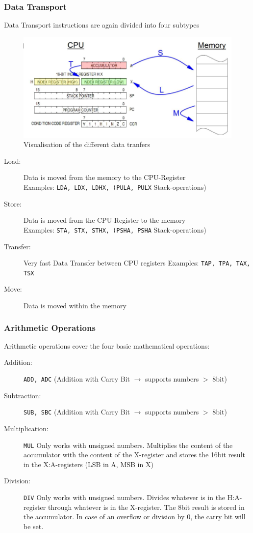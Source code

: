 \documentclass[a4paper, 11pt, nofootinbib]{book}
\newcommand{\code}[1]{\texttt{#1}}
\begin{document}
\subsubsection{Data Transport}
Data Transport instructions are again divided into four subtypes

\begin{figure}[htb!]
	\centering
	\includegraphics[keepaspectratio=true,height=15\baselineskip]{assOperations.PNG}
	\caption{Visualisation of the different data tranfers}
	\label{label}
\end{figure}

\begin{description}
	\item[Load: ] Data is moved from the memory to the CPU-Register \\
		Examples: \code{LDA, LDX, LDHX, (PULA, PULX} Stack-operations)
	\item[Store: ] Data is moved from the CPU-Register to the memory \\
		Examples: \code{STA, STX, STHX, (PSHA, PSHA} Stack-operations) 
	\item[Transfer: ] Very fast Data Transfer between CPU registers
		Examples: \code{TAP, TPA, TAX, TSX}
	\item[Move: ] Data is moved within the memory
\end{description}

\subsubsection{Arithmetic Operations}
Arithmetic operations cover the four basic mathematical operations:

\begin{description}
	\item[Addition: ] \code{ADD, ADC} (Addition with Carry Bit $\rightarrow$ supports numbers $>$ 8bit)
	\item[Subtraction: ] \code{SUB, SBC} (Addition with Carry Bit $\rightarrow$ supports numbers $>$ 8bit)
	\item[Multiplication: ] \code{MUL} Only works with unsigned numbers. Multiplies the content of the accumulator with the content of the X-register and stores the 16bit result in the X:A-registers (LSB in A, MSB in X)
	\item[Division: ] \code{DIV} Only works with unsigned numbers. Divides whatever is in the H:A-register through whatever is in the X-register. The 8bit result is stored in the accumulator. In case of an overflow or division by 0, the carry bit will be set.
\end{description}
\end{document}
